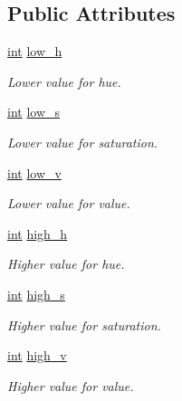 \subsection*{Public Attributes}
\begin{DoxyCompactItemize}
\item 
\mbox{\hyperlink{draw_8hh_aa620a13339ac3a1177c86edc549fda9b}{int}} \mbox{\hyperlink{class_filter_acc9169ecdd67e37c512e7e50b2257805}{low\+\_\+h}}
\begin{DoxyCompactList}\small\item\em Lower value for hue. \end{DoxyCompactList}\item 
\mbox{\hyperlink{draw_8hh_aa620a13339ac3a1177c86edc549fda9b}{int}} \mbox{\hyperlink{class_filter_a4eb6f35c78627a310f1476d37917758c}{low\+\_\+s}}
\begin{DoxyCompactList}\small\item\em Lower value for saturation. \end{DoxyCompactList}\item 
\mbox{\hyperlink{draw_8hh_aa620a13339ac3a1177c86edc549fda9b}{int}} \mbox{\hyperlink{class_filter_a80dc06dbdcdec4106c05793affc9738c}{low\+\_\+v}}
\begin{DoxyCompactList}\small\item\em Lower value for value. \end{DoxyCompactList}\item 
\mbox{\hyperlink{draw_8hh_aa620a13339ac3a1177c86edc549fda9b}{int}} \mbox{\hyperlink{class_filter_a7c77c33e8f7312d1eba4ec414fd21d24}{high\+\_\+h}}
\begin{DoxyCompactList}\small\item\em Higher value for hue. \end{DoxyCompactList}\item 
\mbox{\hyperlink{draw_8hh_aa620a13339ac3a1177c86edc549fda9b}{int}} \mbox{\hyperlink{class_filter_a687104612e7a65d786b72a79de954ea3}{high\+\_\+s}}
\begin{DoxyCompactList}\small\item\em Higher value for saturation. \end{DoxyCompactList}\item 
\mbox{\hyperlink{draw_8hh_aa620a13339ac3a1177c86edc549fda9b}{int}} \mbox{\hyperlink{class_filter_a5e052ace2bd9e0e424aef5be43df526d}{high\+\_\+v}}
\begin{DoxyCompactList}\small\item\em Higher value for value. \end{DoxyCompactList}\end{DoxyCompactItemize}
